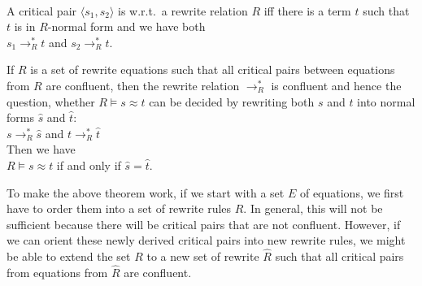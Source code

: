 \begin{Definition} \hspace*{\fill} \\
  A critical pair $\langle s_1, s_2\rangle$ is  w.r.t.~a rewrite relation $R$ iff there is a term
  $t$ such that $t$ is in $R$-normal form and we have both
  \\[0.2cm]
  \hspace*{1.3cm}
  $s_1 \rightarrow^*_R t$ \quad and \quad   $s_2 \rightarrow^*_R t$.  
\end{Definition}

\begin{Theorem}
  If $R$ is a set of rewrite equations such that all critical pairs between equations from $R$ are confluent,
  then the rewrite relation $\rightarrow^*_R$ is confluent and hence the question, whether $R \models s \approx t$
  can be decided by rewriting both $s$ and $t$ into normal forms $\widehat{s}$ and $\widehat{t}$:
  \\[0.2cm]
  \hspace*{1.3cm}
  $s \rightarrow^*_R \widehat{s}$ \quad and \quad  $t \rightarrow^*_R \widehat{t}$ 
  \\[0.2cm]
  Then we have
  \\[0.2cm]
  \hspace*{1.3cm}
  $R \models s \approx t$ \quad if and only if \quad $\widehat{s} = \widehat{t}$.
\end{Theorem}

\noindent
To make the above theorem work, if we start with a set $E$ of equations, we first have to order them into a set
of rewrite rules $R$.  In general, this will not be sufficient because there will be critical pairs that are
not confluent. However, if we can orient these newly derived critical pairs into new rewrite rules, we might be
able to extend the set $R$ to a new set of rewrite $\widehat{R}$ such that all critical pairs from equations
from $\widehat{R}$ are confluent.
\vspace*{0.2cm}

